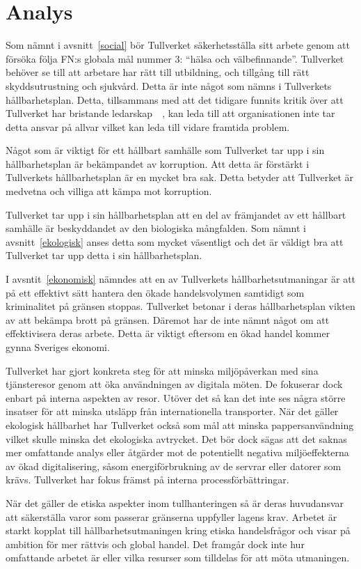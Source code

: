 \section{Analys}

Som nämnt i avsnitt~\ref{social} bör Tullverket säkerhetsställa sitt arbete
genom att försöka följa FN:s globala mål nummer 3: ``hälsa och välbefinnande''.
Tullverket behöver se till att arbetare har rätt till utbildning, och tillgång
till rätt skyddsutrustning och sjukvård. Detta är inte något som nämns i
Tullverkets hållbarhetsplan. Detta, tillsammans med att det tidigare funnits
kritik över att Tullverket har bristande ledarskap~\cite{uppror}~\cite{fara},
kan leda till att organisationen inte tar detta ansvar på allvar vilket kan
leda till vidare framtida problem.

Något som är viktigt för ett hållbart samhälle som Tullverket tar upp i sin
hållbarhetsplan är bekämpandet av korruption. Att detta är förstärkt i
Tullverkets hållbarhetsplan är en mycket bra sak. Detta betyder att Tullverket
är medvetna och villiga att kämpa mot korruption. 

Tullverket tar upp i sin hållbarhetsplan att en del av främjandet av ett
hållbart samhälle är beskyddandet av den biologiska mångfalden. Som nämnt i
avsnitt~\ref{ekologisk} anses detta som mycket väsentligt och det är väldigt
bra att Tullverket tar upp detta i sin hållbarhetsplan.

I avsntit~\ref{ekonomisk} nämndes att en av Tullverkets hållbarhetsutmaningar
är att på ett effektivt sätt hantera den ökade handelsvolymen samtidigt som
kriminalitet på gränsen stoppas. Tullverket betonar i deras hållbarhetsplan
vikten av att bekämpa brott på gränsen. Däremot har de inte nämnt något om att
effektivisera deras arbete. Detta är viktigt eftersom en ökad handel kommer
gynna Sveriges ekonomi. 

Tullverket har gjort konkreta steg för att minska miljöpåverkan med sina
tjänsteresor genom att öka användningen av digitala möten. De fokuserar dock
enbart på interna aspekten av resor. Utöver det så kan det inte ses några
större insatser för att minska utsläpp från internationella transporter. När
det gäller ekologisk hållbarhet har Tullverket också som mål att minska
pappersanvändning vilket skulle minska det ekologiska avtrycket. Det bör dock
sägas att det saknas mer omfattande analys eller åtgärder mot de potentiellt
negativa miljöeffekterna av ökad digitalisering, såsom energiförbrukning av de
servrar eller datorer som krävs. Tullverket har fokus främst på interna
processförbättringar.

När det gäller de etiska aspekter inom tullhanteringen så är deras huvudansvar
att säkerställa varor som passerar gränserna uppfyller lagens krav. Arbetet är
starkt kopplat till hållbarhetsutmaningen kring etiska handelsfrågor och visar
på ambition för mer rättvis och global handel. Det framgår dock inte hur
omfattande arbetet är eller vilka resurser som tilldelas för att möta
utmaningen.

